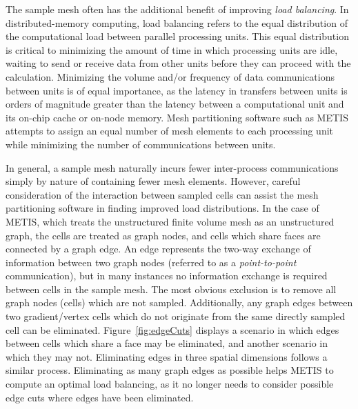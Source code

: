 The sample mesh often has the additional benefit of improving \textit{load balancing}. In distributed-memory computing, load balancing refers to the equal distribution of the computational load between parallel processing units. This equal distribution is critical to minimizing the amount of time in which processing units are idle, waiting to send or receive data from other units before they can proceed with the calculation. Minimizing the volume and/or frequency of data communications between units is of equal importance, as the latency in transfers between units is orders of magnitude greater than the latency between a computational unit and its on-chip cache or on-node memory. Mesh partitioning software such as METIS~\cite{metis} attempts to assign an equal number of mesh elements to each processing unit while minimizing the number of communications between units.

In general, a sample mesh naturally incurs fewer inter-process communications simply by nature of containing fewer mesh elements. However, careful consideration of the interaction between sampled cells can assist the mesh partitioning software in finding improved load distributions. In the case of METIS, which treats the unstructured finite volume mesh as an unstructured graph, the cells are treated as graph nodes, and cells which share faces are connected by a graph edge. An edge represents the two-way exchange of information between two graph nodes (referred to as a \textit{point-to-point} communication), but in many instances no information exchange is required between cells in the sample mesh. The most obvious exclusion is to remove all graph nodes (cells) which are not sampled. Additionally, any graph edges between two gradient/vertex cells which do not originate from the same directly sampled cell can be eliminated. Figure~\ref{fig:edgeCuts} displays a scenario in which edges between cells which share a face may be eliminated, and another scenario in which they may not. Eliminating edges in three spatial dimensions follows a similar process. Eliminating as many graph edges as possible helps METIS to compute an optimal load balancing, as it no longer needs to consider possible edge cuts where edges have been eliminated.

